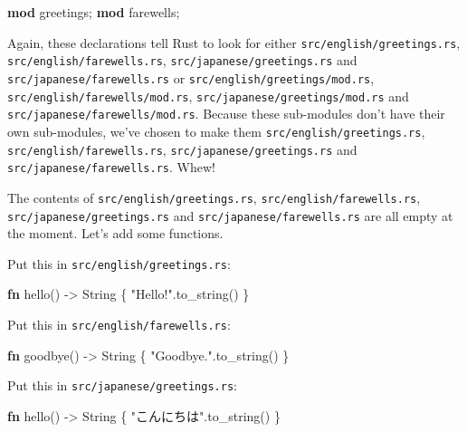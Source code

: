 \documentclass[a4paper,]{book}
\newenvironment{Shaded}{\begin{snugshade}}{\end{snugshade}}
\newcommand{\KeywordTok}[1]{\textcolor[rgb]{0.13,0.29,0.53}{\textbf{{#1}}}}
\newcommand{\DataTypeTok}[1]{\textcolor[rgb]{0.13,0.29,0.53}{{#1}}}
\newcommand{\StringTok}[1]{\textcolor[rgb]{0.31,0.60,0.02}{{#1}}}
\newcommand{\NormalTok}[1]{{#1}}
\begin{document}
\begin{Shaded}
\begin{Highlighting}[]
\KeywordTok{mod} \NormalTok{greetings;}
\KeywordTok{mod} \NormalTok{farewells;}
\end{Highlighting}
\end{Shaded}

Again, these declarations tell Rust to look for either
\texttt{src/english/greetings.rs}, \texttt{src/english/farewells.rs},
\texttt{src/japanese/greetings.rs} and
\texttt{src/japanese/farewells.rs} or
\texttt{src/english/greetings/mod.rs},
\texttt{src/english/farewells/mod.rs},
\texttt{src/japanese/greetings/mod.rs} and
\texttt{src/japanese/farewells/mod.rs}. Because these sub-modules don't
have their own sub-modules, we've chosen to make them
\texttt{src/english/greetings.rs}, \texttt{src/english/farewells.rs},
\texttt{src/japanese/greetings.rs} and
\texttt{src/japanese/farewells.rs}. Whew!

The contents of \texttt{src/english/greetings.rs},
\texttt{src/english/farewells.rs}, \texttt{src/japanese/greetings.rs}
and \texttt{src/japanese/farewells.rs} are all empty at the moment.
Let's add some functions.

Put this in \texttt{src/english/greetings.rs}:

\begin{Shaded}
\begin{Highlighting}[]
\KeywordTok{fn} \NormalTok{hello() -> }\DataTypeTok{String} \NormalTok{\{}
    \StringTok{"Hello!"}\NormalTok{.to_string()}
\NormalTok{\}}
\end{Highlighting}
\end{Shaded}

Put this in \texttt{src/english/farewells.rs}:

\begin{Shaded}
\begin{Highlighting}[]
\KeywordTok{fn} \NormalTok{goodbye() -> }\DataTypeTok{String} \NormalTok{\{}
    \StringTok{"Goodbye."}\NormalTok{.to_string()}
\NormalTok{\}}
\end{Highlighting}
\end{Shaded}

Put this in \texttt{src/japanese/greetings.rs}:

\begin{Shaded}
\begin{Highlighting}[]
\KeywordTok{fn} \NormalTok{hello() -> }\DataTypeTok{String} \NormalTok{\{}
    \StringTok{"こんにちは"}\NormalTok{.to_string()}
\NormalTok{\}}
\end{Highlighting}
\end{Shaded}
\end{document}
